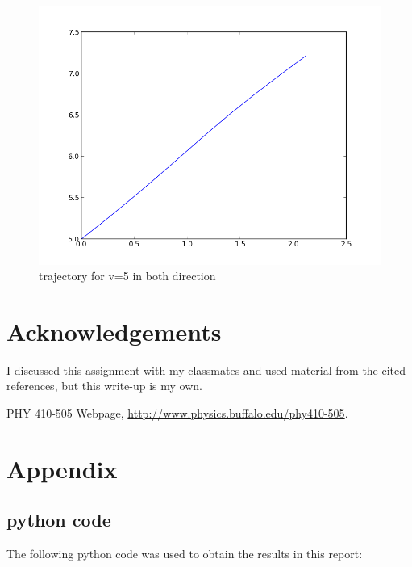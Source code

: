 \documentclass[11pt,letterpaper]{article}
\begin{document}
\begin{figure}
\begin{center}
\includegraphics[width=0.8\linewidth,angle=0]{v55.png}
\caption{trajectory for v=5 in both direction}
\label{figure7}
\end{center}
\end{figure}


\newpage
\section*{Acknowledgements}

I discussed this assignment with my classmates and used material from the
cited references, but this write-up is my own.

\begin{thebibliography}{9}


PHY 410-505 Webpage, \url{http://www.physics.buffalo.edu/phy410-505}.



\end{thebibliography}

\newpage
\appendix
\section{Appendix}

\subsection{python code}

The following python code was used to obtain the results in this report:






\end{document}
